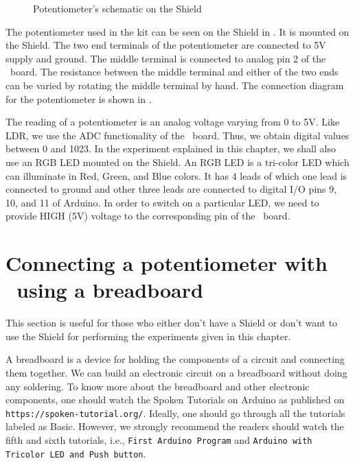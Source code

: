 \begin{figure}
\centering
{} \hfill
{}
\caption{Potentiometer's schematic on the Shield}
\label{fig:potmeterconn}
\end{figure}

The potentiometer used in the kit can be seen on the Shield in
.  It is
mounted on the Shield. The two end terminals of the potentiometer are
connected to 5V supply and ground. The middle terminal is connected to
analog pin 2 of the \arduino\ board. The resistance between the middle
terminal and either of the two ends can be varied by rotating the
middle terminal by hand. The connection diagram for the potentiometer
is shown in .

The reading of a potentiometer is an analog voltage varying from 0 to
5V. Like LDR, we use the ADC functionality of the
\arduino\ board. Thus, we obtain digital values between 0 and 1023. 
In the experiment explained in this chapter, we shall also use an RGB
LED mounted on the Shield. An RGB LED is a tri-color LED which can
illuminate in Red, Green, and Blue colors. It has 4 leads of which one
lead is connected to ground and other three leads are connected to
digital I/O pins 9, 10, and 11 of Arduino. In order to switch on a
particular LED, we need to provide HIGH (5V) voltage to the
corresponding pin of the \arduino\ board.

\section{Connecting a potentiometer with \arduino\ using a breadboard}
This section is useful for those who either don't have a Shield or don't want to use the Shield
for performing the experiments given in this chapter.

A breadboard is a device for holding the components of a circuit and connecting 
them together. We can build an electronic circuit on a breadboard without doing any 
soldering. To know more about the breadboard and other electronic components, 
one should watch the Spoken Tutorials on Arduino as published on
{\tt https://spoken-tutorial.org/}. Ideally, one should go through all the
tutorials labeled as Basic. However, we strongly recommend the readers should
watch the fifth and sixth tutorials, i.e., {\tt First Arduino Program} and 
{\tt Arduino with Tricolor LED and Push button}.

